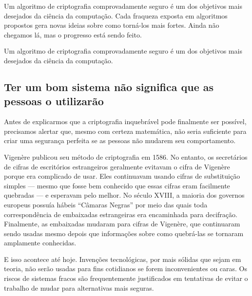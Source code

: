 \documentclass{book}
\begin{document}
Um algoritmo de criptografia comprovadamente seguro é um dos objetivos mais desejados da ciência da computação. Cada fraqueza exposta em algoritmos propostos gera novas ideias sobre como torná-los mais fortes. Ainda não chegamos lá, mas o progresso está sendo feito.

Um algoritmo de criptografia comprovadamente seguro é um dos objetivos mais desejados da ciência da computação.


\subsection{Ter um bom sistema não significa que as pessoas o utilizarão}
\label{segredos:bom-sistema}

Antes de explicarmos que a criptografia inquebrável pode finalmente ser possível, precisamos alertar que, mesmo com certeza matemática, não seria suficiente para criar uma segurança perfeita se as pessoas não mudarem seu comportamento.

Vigenère publicou seu método de criptografia em 1586. No entanto, os secretários de cifras de escritórios estrangeiros geralmente evitavam o cifra de Vigenère porque era complicado de usar. Eles continuavam usando cifras de substituição simples --- mesmo que fosse bem conhecido que essas cifras eram facilmente quebradas --- e esperavam pelo melhor. No século XVIII, a maioria dos governos europeus possuía hábeis ``Câmaras Negras'' por meio das quais toda correspondência de embaixadas estrangeiras era encaminhada para decifração. Finalmente, as embaixadas mudaram para cifras de Vigenère, que continuaram sendo usadas mesmo depois que informações sobre como quebrá-las se tornaram amplamente conhecidas.

E isso acontece até hoje. Invenções tecnológicas, por mais sólidas que sejam em teoria, não serão usadas para fins cotidianos se forem inconvenientes ou caras. Os riscos de sistemas fracos são frequentemente justificados em tentativas de evitar o trabalho de mudar para alternativas mais seguras.
\end{document}
